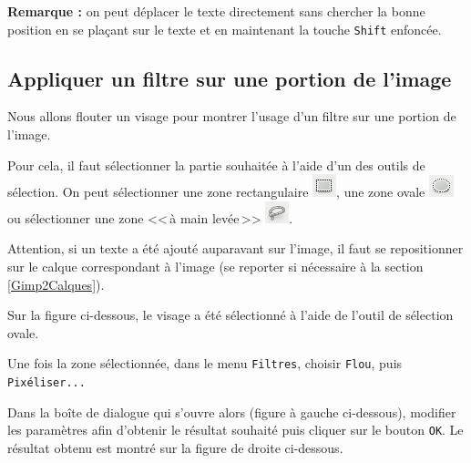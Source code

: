 \vspace{1em}

\textbf{Remarque :} on peut déplacer le texte directement sans chercher la bonne position en se plaçant sur le texte et en maintenant la touche \texttt{Shift} enfoncée.



\subsection{Appliquer un filtre sur une portion de l'image}\label{Gimp2AppliquerFiltre}

Nous allons flouter un visage pour montrer l'usage d'un filtre sur une portion de l'image.

Pour cela, il faut sélectionner la partie souhaitée à l'aide d'un des outils de sélection. On peut sélectionner une zone rectangulaire \includegraphics[width=.6cm]{./images/image02/iconeSelecRectangle}, une zone ovale \includegraphics[width=.6cm]{./images/image02/iconeSelecOvale} ou sélectionner une zone <<\,à main levée\,>> \includegraphics[width=.6cm]{./images/image02/iconeSelecLasso}.

\vspace{6pt}

Attention, si un texte a été ajouté auparavant sur l'image, il faut se repositionner sur le calque correspondant à l'image (se reporter si nécessaire à la section \vref{Gimp2Calques}). 

\vspace{6pt}

Sur la figure ci-dessous, le visage a été sélectionné à l'aide de l'outil de sélection ovale.


Une fois la zone sélectionnée, dans le menu \texttt{Filtres}, choisir \texttt{Flou}, puis \texttt{Pixéliser...}   


Dans la boîte de dialogue qui s'ouvre alors (figure à gauche ci-dessous), modifier les paramètres afin d'obtenir le résultat souhaité puis cliquer sur le bouton \texttt{OK}. Le résultat obtenu est montré sur la figure de droite ci-dessous.

